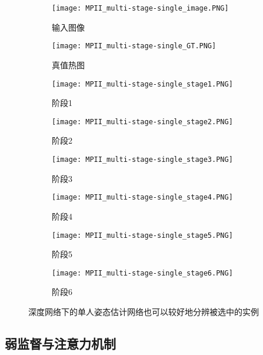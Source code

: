 \begin{figure}[h]
\centering
\begin{subfigure}[b]{0.2\linewidth}
	\texttt{[image: MPII\_multi-stage-single\_image.PNG]}
	\caption{输入图像}
\end{subfigure}
\begin{subfigure}[b]{0.2\linewidth}
	\texttt{[image: MPII\_multi-stage-single\_GT.PNG]}
	\caption{真值热图}
\end{subfigure}
\begin{subfigure}[b]{0.2\linewidth}
	\texttt{[image: MPII\_multi-stage-single\_stage1.PNG]}
	\caption{阶段1}
\end{subfigure}
\begin{subfigure}[b]{0.2\linewidth}
	\texttt{[image: MPII\_multi-stage-single\_stage2.PNG]}
	\caption{阶段2}
\end{subfigure}

\begin{subfigure}[b]{0.2\linewidth}
	\texttt{[image: MPII\_multi-stage-single\_stage3.PNG]}
	\caption{阶段3}
\end{subfigure}
\begin{subfigure}[b]{0.2\linewidth}
	\texttt{[image: MPII\_multi-stage-single\_stage4.PNG]}
	\caption{阶段4}
\end{subfigure}
\begin{subfigure}[b]{0.2\linewidth}
	\texttt{[image: MPII\_multi-stage-single\_stage5.PNG]}
	\caption{阶段5}
\end{subfigure}
\begin{subfigure}[b]{0.2\linewidth}
	\texttt{[image: MPII\_multi-stage-single\_stage6.PNG]}
	\caption{阶段6}
\end{subfigure}
\caption{深度网络下的单人姿态估计网络也可以较好地分辨被选中的实例}
\label{fig:singleposemultistage}
\end{figure}

\subsection{弱监督与注意力机制}
\label{subsec:weaksuper_attention}

